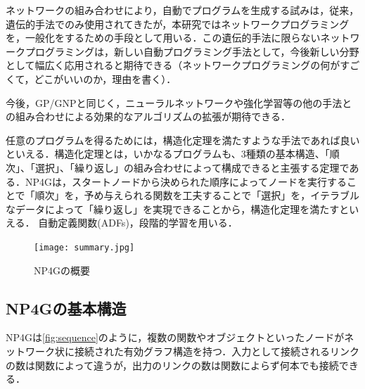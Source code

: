 \documentclass[exploratorypaper]{jsaiart} %
\begin{document}
ネットワークの組み合わせにより，自動でプログラムを生成する試みは，従来，遺伝的手法でのみ使用されてきたが，本研究ではネットワークプログラミングを，一般化をするための手段として用いる．この遺伝的手法に限らないネットワークプログラミングは，新しい自動プログラミング手法として，今後新しい分野として幅広く応用されると期待できる（ネットワークプログラミングの何がすごくて，どこがいいのか，理由を書く）．

今後，GP/GNPと同じく，ニューラルネットワークや強化学習等の他の手法との組み合わせによる効果的なアルゴリズムの拡張が期待できる．

任意のプログラムを得るためには，構造化定理を満たすような手法であれば良いといえる．構造化定理とは，いかなるプログラムも、3種類の基本構造、「順次」、「選択」、「繰り返し」の組み合わせによって構成できると主張する定理である\cite{StructuredProgramming}．NP4Gは，スタートノードから決められた順序によってノードを実行することで「順次」を，予め与えられる関数を工夫することで「選択」を，イテラブルなデータによって「繰り返し」を実現できることから，構造化定理を満たすといえる．
自動定義関数(ADFs)，段階的学習を用いる．

\begin{figure}[t]
    \begin{center}
        \texttt{[image: summary.jpg]}
    \end{center}
    \capwidth=90mm %
    \caption{NP4Gの概要}
    \label{fig:summary}
\end{figure}

\subsection{NP4Gの基本構造}
NP4Gは\ref{fig:sequence}のように，複数の関数やオブジェクトといったノードがネットワーク状に接続された有効グラフ構造を持つ．入力として接続されるリンクの数は関数によって違うが，出力のリンクの数は関数によらず何本でも接続できる．
\end{document}

